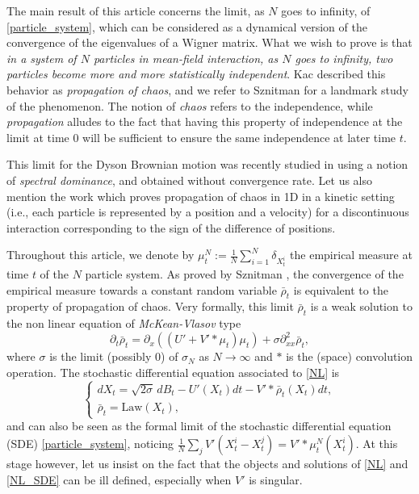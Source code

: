 \documentclass[11pt]{article}
\newcommand{\ie}{i.e.,\xspace}
\theoremstyle{plain}
\theoremstyle{definition}
\begin{document}
The main result of this article concerns the limit, as $N$ goes to infinity, of \eqref{particle_system}, which can be considered as a dynamical version of the convergence of the eigenvalues of a Wigner matrix. What we wish to prove is that \textit{in a system of $N$ particles in mean-field interaction, as $N$ goes to infinity, two particles become more and more statistically independent}. Kac \cite{kac1956} described this behavior as \textit{propagation of chaos}, and we refer to Sznitman \cite{Saint_Flour_1991} for a landmark study of the phenomenon. The notion of \textit{chaos} refers to the independence, while \textit{propagation} alludes to the fact that having this property of independence at the limit at time $0$ will be sufficient to ensure the same independence at later time $t$.

This limit for the Dyson Brownian motion was recently studied in \cite{BDLL21} using a notion of \textit{spectral dominance}, and obtained without convergence rate. Let us also mention the work \cite{HS19} which proves propagation of chaos in 1D in a kinetic setting (\ie each particle is represented by a position and a velocity) for a discontinuous interaction corresponding to the sign of the difference of positions.

Throughout this article, we denote by $\mu^N_t:=\frac{1}{N}\sum_{i=1}^N\delta_{X^i_t}$ the empirical measure at time $t$ of the $N$ particle system. As proved by Sznitman \cite{Saint_Flour_1991}, the convergence of the empirical measure towards a constant random variable $\bar{\rho}_t$ is equivalent to the property of propagation of chaos. Very formally, this limit $\bar{\rho}_t$ is a weak solution to the non linear equation of \textit{McKean-Vlasov} type
\begin{equation}\label{NL}
\partial_t \bar{\rho}_t=\partial_x\left(\left(U'+V'\ast\mu_t\right)\mu_t\right)+\sigma \partial^2_{xx}\bar{\rho}_t,
\end{equation}
where $\sigma$ is the limit (possibly $0$) of $\sigma_N$ as $N\to\infty$ and $\ast$ is the (space) convolution operation. The stochastic differential equation associated to \eqref{NL} is
\begin{equation}\label{NL_SDE}
\begin{cases}
dX_t=\sqrt{2\sigma}\,dB_t-U'(X_t)dt-V'\ast\bar{\rho}_t(X_t)dt,\\
\bar{\rho}_t=\text{Law}(X_t),
\end{cases}
\end{equation}
and can also be seen as the formal limit of the stochastic differential equation (SDE) \eqref{particle_system}, noticing $\frac{1}{N}\sum_{j}V'(X^i_t-X^j_t)=V'\ast\mu^N_t(X^i_t).$ At this stage however, let us insist on the fact that the objects and solutions of \eqref{NL} and \eqref{NL_SDE} can be ill defined, especially when $V'$ is singular.
\end{document}
